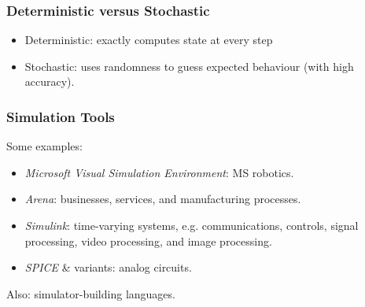 \begin{frame}
\frametitle{Deterministic versus Stochastic}

\begin{changemargin}{1cm}
\begin{itemize}
\item Deterministic: exactly computes state at every step
\item Stochastic: uses randomness to guess expected behaviour (with high accuracy).
\end{itemize}
\end{changemargin}
\end{frame}

\begin{frame}
\frametitle{Simulation Tools}

\begin{changemargin}{1cm}
Some examples:
\begin{itemize}
\item \emph{Microsoft Visual Simulation Environment}: MS robotics.
\item \emph{Arena}: businesses, services, and manufacturing processes.
\item \emph{Simulink}: time-varying systems, e.g. communications, controls, signal processing, video processing, and image processing.
\item \emph{SPICE} \& variants: analog circuits.
\end{itemize}

Also: simulator-building languages.
\end{changemargin}

\end{frame}


